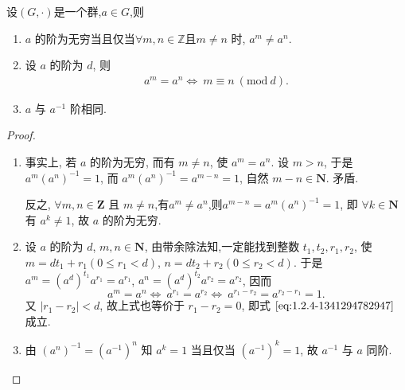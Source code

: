 \documentclass[../../main.tex]{subfiles}
\begin{document}
\begin{theorem}[群的阶的基本性质]
设$(G,\cdot)$是一个群,$a\in G$,则
\begin{enumerate}
\item \( a \) 的阶为无穷当且仅当$\forall m,n\in \mathbb{Z}$且\( m \neq n \) 时, \( a^m \neq a^n \).

\item  设 \( a \) 的阶为 \( d \), 则
\begin{align}
a^m = a^n \iff \ m \equiv n \ (\text{mod}\ d). \label{eq:1.2.4-1341294782947}
\end{align}

\item  \( a \) 与 \( a^{-1} \) 阶相同.
\end{enumerate}
\end{theorem}
\begin{proof}
\begin{enumerate}
\item 事实上, 若 \( a \) 的阶为无穷, 而有 \( m \neq n \), 使 \( a^m = a^n \). 设 \( m > n \), 于是 \( a^m(a^n)^{-1} = 1 \), 而 \( a^m(a^n)^{-1} = a^{m-n} = 1 \), 自然 \( m - n \in \mathbf{N} \). 矛盾.

反之, \( \forall m, n \in \mathbf{Z} \) 且 \( m \neq n \),有\( a^m \neq a^n \),则\( a^{m-n} = a^m(a^n)^{-1} = 1 \), 即 \( \forall k \in \mathbf{N} \) 有 \( a^k \neq 1 \), 故 \( a \) 的阶为无穷.

\item 设 \( a \) 的阶为 \( d \), \( m, n \in \mathbf{N} \), 由带余除法知,一定能找到整数 \( t_1, t_2, r_1, r_2 \), 使 \( m = dt_1 + r_1 (0 \leqslant r_1 < d) \), \( n = dt_2 + r_2 (0 \leqslant r_2 < d) \). 于是 \( a^m = (a^d)^{t_1} a^{r_1} = a^{r_1} \), \( a^n = (a^d)^{t_2} a^{r_2} = a^{r_2} \), 因而
\[
a^m = a^n \iff \ a^{r_1} = a^{r_2} \iff  \ a^{r_1 - r_2} = a^{r_2 - r_1} = 1.
\]
又 \( |r_1 - r_2| < d \), 故上式也等价于 \( r_1 - r_2 = 0 \), 即式 \(\eqref{eq:1.2.4-1341294782947}\) 成立.

\item 由 \( (a^n)^{-1} = (a^{-1})^n \) 知 \( a^k = 1 \) 当且仅当 \( (a^{-1})^k = 1 \), 故 \( a^{-1} \) 与 \( a \) 同阶.
\end{enumerate}

\end{proof}
\end{document}
